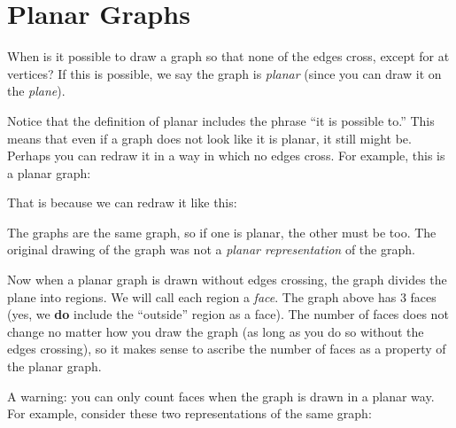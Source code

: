 \documentclass[12pt]{article}
\begin{document}
\section{Planar Graphs}

When is it possible to draw a graph so that none of the edges cross, except for at vertices? If this is possible, we say the graph is {\em planar} (since you can draw it on the {\em plane}).  

Notice that the definition of planar includes the phrase ``it is possible to.''  This means that even if a graph does not look like it is planar, it still might be.  Perhaps you can redraw it in a way in which no edges cross.  For example, this is a planar graph:

\begin{center}

\end{center}

That is because we can redraw it like this:

\begin{center}
\end{center}

The graphs are the same graph, so if one is planar, the other must be too.  The original drawing of the graph was not a {\em planar representation} of the graph.

Now when a planar graph is drawn without edges crossing, the graph divides the plane into regions.  We will call each region a {\em face}.  The graph above has 3 faces (yes, we {\bf do} include the ``outside'' region as a face).  The number of faces does not change no matter how you draw the graph (as long as you do so without the edges crossing), so it makes sense to ascribe the number of faces as a property of the planar graph.

A warning: you can only count faces when the graph is drawn in a planar way.  For example, consider these two representations of the same graph:

\begin{center}
 ~ \hfill
  \hfill
  \hfill ~
\end{center}
\end{document}
